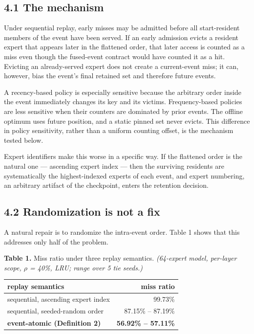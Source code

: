 \documentclass[
  10pt,
  letterpaper,
  10pt]{article}
\newcounter{none} %
\begin{document}
\subsection{4.1 The mechanism}\label{the-mechanism}

Under sequential replay, early misses may be admitted before all
start-resident members of the event have been served. If an early
admission evicts a resident expert that appears later in the flattened
order, that later access is counted as a miss even though the
fused-event contract would have counted it as a hit. Evicting an
already-served expert does not create a current-event miss; it can,
however, bias the event's final retained set and therefore future
events.

A recency-based policy is especially sensitive because the arbitrary
order inside the event immediately changes its key and its victims.
Frequency-based policies are less sensitive when their counters are
dominated by prior events. The offline optimum uses future position, and
a static pinned set never evicts. This difference in policy sensitivity,
rather than a uniform counting offset, is the mechanism tested below.

Expert identifiers make this worse in a specific way. If the flattened
order is the natural one --- ascending expert index --- then the
surviving residents are systematically the highest-indexed experts of
each event, and expert numbering, an arbitrary artifact of the
checkpoint, enters the retention decision.

\subsection{4.2 Randomization is not a
fix}\label{randomization-is-not-a-fix}

A natural repair is to randomize the intra-event order. Table 1 shows
that this addresses only half of the problem.

\textbf{Table 1.} Miss ratio under three replay semantics.
\emph{(64-expert model, per-layer scope, \ensuremath{\rho} = 40\%, LRU;
range over 5 tie seeds.)}

{\def\LTcaptype{none} %
\begin{longtable}[]{@{}lr@{}}
\toprule\noalign{}
replay semantics & miss ratio \\
\midrule\noalign{}
\endhead
\bottomrule\noalign{}
\endlastfoot
sequential, ascending expert index & 99.73\% \\
sequential, seeded-random order & 87.15\% -- 87.19\% \\
\textbf{event-atomic (Definition 2)} & \textbf{56.92\% -- 57.11\%} \\
\end{longtable}
}
\end{document}
